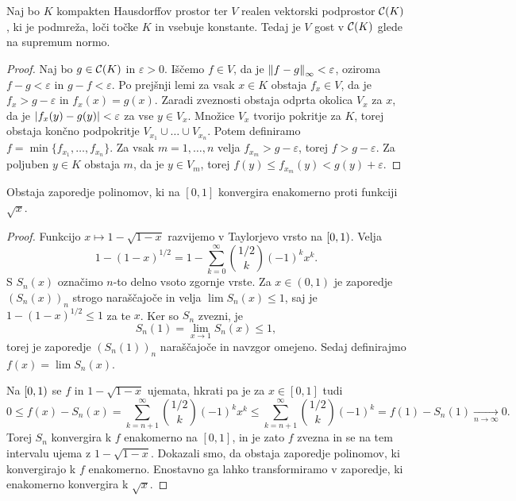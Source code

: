 \begin{izrek}
  Naj bo $K$ kompakten Hausdorffov prostor ter $V$ realen vektorski podprostor
  $\mathcal{C}(K)$, ki je podmreža, loči točke $K$ in vsebuje konstante.
  Tedaj je $V$ gost v $\mathcal{C}(K)$ glede na supremum normo.
\end{izrek}

\begin{proof}
  Naj bo $g \in \mathcal{C}(K)$ in $\varepsilon > 0$.
  Iščemo $f \in V$, da je $\left\lVert f-g\right\rVert_\infty < \varepsilon$, oziroma $f-g <
  \varepsilon$ in $g-f < \varepsilon$.
  Po prejšnji lemi za vsak $x \in K$ obstaja $f_x \in V$, da je $f_x > g -
  \varepsilon$ in $f_x(x) = g(x)$.
  Zaradi zveznosti obstaja odprta okolica $V_x$ za $x$, da je $\left| f_x(y) -
	g(y) \right| < \varepsilon$ za vse $y \in V_x$.
  Množice $V_x$ tvorijo pokritje za $K$, torej obstaja končno podpokritje
  $V_{x_1} \cup \ldots \cup V_{x_n}$.
  Potem definiramo $f = \min \{ f_{x_1}, \ldots, f_{x_n} \}$.
  Za vsak $m = 1, \ldots, n$ velja $f_{x_m} > g - \varepsilon$, torej $f > g -
  \varepsilon$.
  Za poljuben $y \in K$ obstaja $m$, da je $y \in V_m$, torej $f(y) \le
  f_{x_m}(y) < g(y) + \varepsilon$.
\end{proof}


\begin{lema}
  Obstaja zaporedje polinomov, ki na $[0,1]$ konvergira enakomerno proti
  funkciji $\sqrt{x}$.
\end{lema}

\begin{proof}
  Funkcijo $x \mapsto 1 - \sqrt{1-x}$ razvijemo v Taylorjevo vrsto na $\left[0,1\right)$.
  Velja
  \[
	1 - (1 - x)^{1/2} = 1 - \sum_{k=0}^\infty \binom{1/2}{k} (-1)^k x^k.
  \]
  S $S_n(x)$ označimo $n$-to delno vsoto zgornje vrste.
  Za $x \in (0,1)$ je zaporedje $(S_n(x))_n$ strogo naraščajoče in velja $\lim
  S_n(x) \le 1$, saj je $1 - (1 - x)^{1/2} \le 1$ za te $x$.
  Ker so $S_n$ zvezni, je
  \[
	S_n(1) = \lim_{x \to 1} S_n(x) \le 1,
  \]
  torej je zaporedje $(S_n(1))_n$ naraščajoče in navzgor omejeno.
  Sedaj definirajmo $f(x) = \lim S_n(x)$.

  Na $\left[0,1\right)$ se $f$ in $1 - \sqrt{1-x}$ ujemata, hkrati pa je za $x \in
  [0,1]$ tudi
  \[
	0 \le f(x) - S_n(x) = \sum_{k=n+1}^\infty \binom{1/2}{k} (-1)^k x^k
	\le \sum_{k=n+1}^\infty \binom{1/2}{k} (-1)^k
	= f(1) - S_n(1) \xrightarrow[n \to \infty]{} 0.
  \]
  Torej $S_n$ konvergira k $f$ enakomerno na $[0,1]$, in je zato $f$ zvezna in
  se na tem intervalu ujema z $1 - \sqrt{1-x}$.
  Dokazali smo, da obstaja zaporedje polinomov, ki konvergirajo k $f$
  enakomerno.
  Enostavno ga lahko transformiramo v zaporedje, ki enakomerno konvergira k
  $\sqrt{x}$.
\end{proof}

